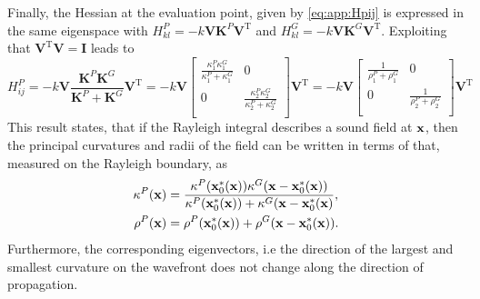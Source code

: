 Finally, the Hessian at the evaluation point, given by \eqref{eq:app:Hpij} is expressed in the same eigenspace with $H^P_{kl} = -k \mathbf{V} \mathbf{K}^P \mathbf{V}^{\mathrm{T}}$ and $H^G_{kl} = -k \mathbf{V} \mathbf{K}^G \mathbf{V}^{\mathrm{T}}$.
Exploiting that $\mathbf{V}^{\mathrm{T}}\mathbf{V} = \mathbf{I}$ leads to
\begin{equation}
H_{ij}^P = 
-k \mathbf{V} \frac{ \mathbf{K}^P \mathbf{K}^G  }{\mathbf{K}^P + \mathbf{K}^G }   \mathbf{V}^{\mathrm{T}} =
-k \mathbf{V} 
\begin{bmatrix}
\frac{\kappa_1^P \kappa_1^G}{\kappa_1^P + \kappa_1^G} & 0 \\[.5em]
0 & \frac{\kappa_2^P \kappa_2^G}{\kappa_2^P + \kappa_2^G}
\\[0.3em]    \end{bmatrix}
\mathbf{V}^{\mathrm{T}}
=
-k \mathbf{V} 
\begin{bmatrix}
\frac{1}{\rho_1^P+\rho_1^G} & 0 \\[.5em]
0 & \frac{1}{\rho_2^P+\rho_2^G}
\\[0.3em]    \end{bmatrix}
\mathbf{V}^{\mathrm{T}}
\end{equation}
This result states, that if the Rayleigh integral describes a sound field at $\mathbf{x}$, then the principal curvatures and radii of the field can be written in terms of that, measured on the Rayleigh boundary, as
\begin{align}
\kappa^P(\mathbf{x}) &= \frac{\kappa^P(\mathbf{x}_0^*(\mathbf{x})) \kappa^G(\mathbf{x}-\mathbf{x}_0^*(\mathbf{x})) }{\kappa^P(\mathbf{x}_0^*(\mathbf{x})) + \kappa^G(\mathbf{x}-\mathbf{x}_0^*(\mathbf{x})}, \nonumber \\
\rho^P(\mathbf{x}) &= \rho^P(\mathbf{x}_0^*(\mathbf{x})) + \rho^G(\mathbf{x}-\mathbf{x}_0^*(\mathbf{x})). 
\label{eq:app:propagated_radii}
\end{align}
Furthermore, the corresponding eigenvectors, i.e the direction of the largest and smallest curvature on the wavefront does not change along the direction of propagation.

\vspace{3mm}

